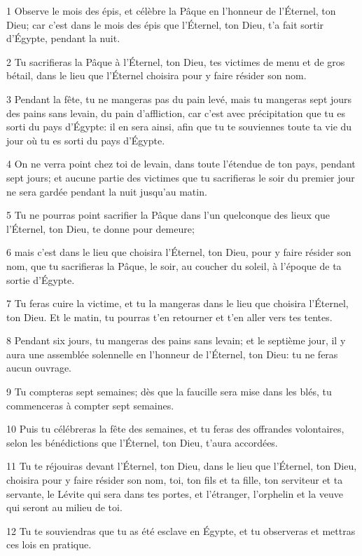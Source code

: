 \par 1 Observe le mois des épis, et célèbre la Pâque en l'honneur de l'Éternel, ton Dieu; car c'est dans le mois des épis que l'Éternel, ton Dieu, t'a fait sortir d'Égypte, pendant la nuit.
\par 2 Tu sacrifieras la Pâque à l'Éternel, ton Dieu, tes victimes de menu et de gros bétail, dans le lieu que l'Éternel choisira pour y faire résider son nom.
\par 3 Pendant la fête, tu ne mangeras pas du pain levé, mais tu mangeras sept jours des pains sans levain, du pain d'affliction, car c'est avec précipitation que tu es sorti du pays d'Égypte: il en sera ainsi, afin que tu te souviennes toute ta vie du jour où tu es sorti du pays d'Égypte.
\par 4 On ne verra point chez toi de levain, dans toute l'étendue de ton pays, pendant sept jours; et aucune partie des victimes que tu sacrifieras le soir du premier jour ne sera gardée pendant la nuit jusqu'au matin.
\par 5 Tu ne pourras point sacrifier la Pâque dans l'un quelconque des lieux que l'Éternel, ton Dieu, te donne pour demeure;
\par 6 mais c'est dans le lieu que choisira l'Éternel, ton Dieu, pour y faire résider son nom, que tu sacrifieras la Pâque, le soir, au coucher du soleil, à l'époque de ta sortie d'Égypte.
\par 7 Tu feras cuire la victime, et tu la mangeras dans le lieu que choisira l'Éternel, ton Dieu. Et le matin, tu pourras t'en retourner et t'en aller vers tes tentes.
\par 8 Pendant six jours, tu mangeras des pains sans levain; et le septième jour, il y aura une assemblée solennelle en l'honneur de l'Éternel, ton Dieu: tu ne feras aucun ouvrage.
\par 9 Tu compteras sept semaines; dès que la faucille sera mise dans les blés, tu commenceras à compter sept semaines.
\par 10 Puis tu célébreras la fête des semaines, et tu feras des offrandes volontaires, selon les bénédictions que l'Éternel, ton Dieu, t'aura accordées.
\par 11 Tu te réjouiras devant l'Éternel, ton Dieu, dans le lieu que l'Éternel, ton Dieu, choisira pour y faire résider son nom, toi, ton fils et ta fille, ton serviteur et ta servante, le Lévite qui sera dans tes portes, et l'étranger, l'orphelin et la veuve qui seront au milieu de toi.
\par 12 Tu te souviendras que tu as été esclave en Égypte, et tu observeras et mettras ces lois en pratique.
